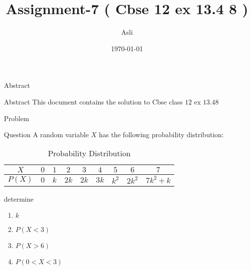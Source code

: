 \documentclass{beamer}
\title{ Assignment-7 ( Cbse 12 ex 13.4 8 )}
\author{Asli}
\institute{IIT Hyderabad}
\date{\today }
\begin{document}
\begin{frame}
      \titlepage
\end{frame}



\begin{frame}{Abstract}
     \begin{block}{Abstract}
          This document contains the solution to Cbse class $12$ ex $13.4 8$
      \end{block}
\end{frame}



\begin{frame}{Problem}
       \begin{block}{Question}
           A random variable $X$ has the following probability distribution:
           
               \begin{table}[!htb]
                     \centering
                            {
                                   \begin{tabular}{|c|c|c|c|c|c|c|c|c|}
                                       \hline
                                         $X$ & $0$ & $1$ & $2$ & $3$ & $4$ & $5$ & $6$ & $7$  \\ \hline
                                      $P(X)$ & $0$ & $k$ & $2k$ & $2k$ & $3k$ & $k^{2}$ & $2 k^{2}$ &    $7k^{2}+k$ \\ \hline
                                   \end{tabular}
                              }
                         \caption{ Probability Distribution }
                         \label{tab:table}
              \end{table}
              
              determine
              
              \begin{enumerate}
                  \item $k$
                  \item $P(X < 3)$
                  \item $P(X > 6)$
                  \item $P(0 < X < 3)$
              \end{enumerate}
                          
       \end{block}
       
\end{frame}
\end{document}
